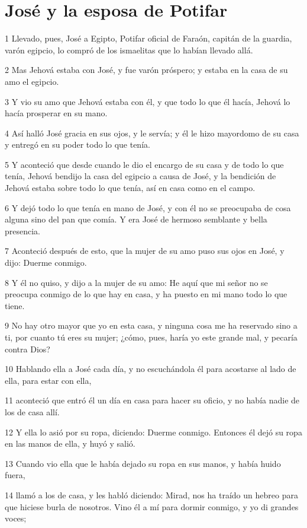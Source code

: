 \section*{José y la esposa de Potifar}

\par 1 Llevado, pues, José a Egipto, Potifar oficial de Faraón, capitán de la guardia, varón egipcio, lo compró de los ismaelitas que lo habían llevado allá.
\par 2 Mas Jehová estaba con José, y fue varón próspero; y estaba en la casa de su amo el egipcio.
\par 3 Y vio su amo que Jehová estaba con él, y que todo lo que él hacía, Jehová lo hacía prosperar en su mano.
\par 4 Así halló José gracia en sus ojos, y le servía; y él le hizo mayordomo de su casa y entregó en su poder todo lo que tenía.
\par 5 Y aconteció que desde cuando le dio el encargo de su casa y de todo lo que tenía, Jehová bendijo la casa del egipcio a causa de José, y la bendición de Jehová estaba sobre todo lo que tenía, así en casa como en el campo.
\par 6 Y dejó todo lo que tenía en mano de José, y con él no se preocupaba de cosa alguna sino del pan que comía. Y era José de hermoso semblante y bella presencia.
\par 7 Aconteció después de esto, que la mujer de su amo puso sus ojos en José, y dijo: Duerme conmigo.
\par 8 Y él no quiso, y dijo a la mujer de su amo: He aquí que mi señor no se preocupa conmigo de lo que hay en casa, y ha puesto en mi mano todo lo que tiene.
\par 9 No hay otro mayor que yo en esta casa, y ninguna cosa me ha reservado sino a ti, por cuanto tú eres su mujer; ¿cómo, pues, haría yo este grande mal, y pecaría contra Dios?
\par 10 Hablando ella a José cada día, y no escuchándola él para acostarse al lado de ella, para estar con ella,
\par 11 aconteció que entró él un día en casa para hacer su oficio, y no había nadie de los de casa allí.
\par 12 Y ella lo asió por su ropa, diciendo: Duerme conmigo. Entonces él dejó su ropa en las manos de ella, y huyó y salió.
\par 13 Cuando vio ella que le había dejado su ropa en sus manos, y había huido fuera,
\par 14 llamó a los de casa, y les habló diciendo: Mirad, nos ha traído un hebreo para que hiciese burla de nosotros. Vino él a mí para dormir conmigo, y yo di grandes voces;
